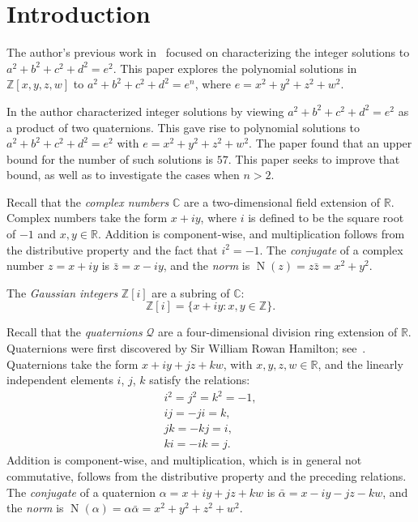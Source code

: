 \documentclass[12pt,table]{article}
\theoremstyle{definition}
\theoremstyle{remark}
\newcommand{\Ccc}{\mathbb C}
\newcommand{\Rrr}{\mathbb R}
\newcommand{\Zzz}{\mathbb Z}
\numberwithin{equation}{section}
\DeclareMathOperator{\N}{N}
\begin{document}
\listoftodos




\section{Introduction}


The author's previous work in~\cite{Ehrenborg_2018}
focused on characterizing the
integer solutions to
$a^2 + b^2 + c^2 + d^2 = e^2$.
This paper explores the polynomial solutions
in $ \Zzz[x,y,z,w] $ to
$a^2 + b^2 + c^2 + d^2 = e^n$, where
$e = x^2 + y^2 + z^2 + w^2$.

In \cite{Ehrenborg_2018} the author characterized integer
solutions by viewing $a^2 + b^2 + c^2 + d^2 = e^2$
as a product of two quaternions. This gave
rise to polynomial solutions to
$a^2 + b^2 + c^2 + d^2 = e^2$
with $e = x^2 + y^2 + z^2 + w^2$.
The paper found that an upper bound for the number
of such solutions is $57$. This paper seeks to
improve that bound, as well as to investigate
the cases when $n > 2$.


Recall that the \emph{complex numbers} $\Ccc$ are a two-dimensional
field extension of $\Rrr$.
Complex numbers take the form $x + iy$, where $i$ is defined to be the
square root of $-1$ and $x,y \in \Rrr$.
Addition is component-wise, and multiplication
follows from the distributive property and the fact that
$i^2 = -1$.
The \emph{conjugate} of a complex number $ z = x + iy$ is $ \bar{z} = x - iy$, and  
the \emph{norm} is $ \N(z) = z \bar{z} = x^2 + y^2$.  

The \emph{Gaussian integers} $ \Zzz[i] $ are a subring of $\Ccc$:
\[
\Zzz[i] = \{ x + iy: x,y \in \Zzz \}.
\]



Recall that
the \emph{quaternions} $\mathscr{Q}$ are a four-dimensional division ring extension of $\Rrr$.
Quaternions were first discovered by Sir William Rowan Hamilton;
see~\cite{Hamilton}.
Quaternions take the form $x + iy + jz + kw$, with
$x,y,z,w \in \Rrr$, and the linearly independent
elements $i$, $j$, $k$ satisfy the relations:
\begin{align*}
i^2 = j^2 = k^2 = -1,
\\
ij = -ji = k,
\\
jk = -kj = i,
\\
ki = -ik = j.
\end{align*}
Addition is component-wise, and multiplication, which is
in general not commutative,
follows from the distributive property and the preceding relations.
The \emph{conjugate} of a quaternion $ \alpha = x + iy + jz + kw$
is $ \bar{\alpha} = x - iy - jz - kw$,  
and the \emph{norm} is 
$ \N( \alpha ) = \alpha \bar{\alpha} = x^2 + y^2 + z^2 + w^2$.  
\end{document}
